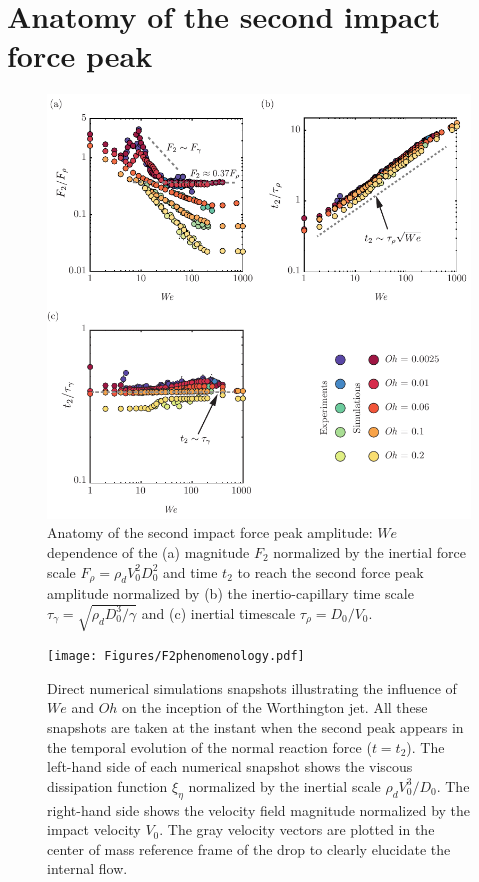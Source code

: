 \documentclass{jfm}
\begin{document}
	\section{Anatomy of the second impact force peak}\label{sec:SecondPeak}
	
	\begin{figure}
		\centering
		\includegraphics[width=\textwidth]{Figures/Force2_Anatomy_v4.pdf}
		\caption{Anatomy of the second impact force peak amplitude: $We$ dependence of the (a) magnitude $F_2$ normalized by the inertial force scale $F_\rho = \rho_dV_0^2D_0^2$ and time $t_2$ to reach the second force peak amplitude normalized by (b) the inertio-capillary time scale $\tau_\gamma = \sqrt{\rho_dD_0^3/\gamma}$ and (c) inertial timescale $\tau_\rho = D_0/V_0$.}
		\label{fig:F2Anatomy}
	\end{figure}
	
	\begin{figure}
		\centering
		\texttt{[image: Figures/F2phenomenology.pdf]}
		\caption{Direct numerical simulations snapshots illustrating the influence of $We$ and $Oh$ on the inception of the Worthington jet. All these snapshots are taken at the instant when the second peak appears in the temporal evolution of the normal reaction force ($t = t_2$). The left-hand side of each numerical snapshot shows the viscous dissipation function $\xi_\eta$ normalized by the inertial scale $\rho_dV_0^3/D_0$. The right-hand side shows the velocity field magnitude normalized by the impact velocity $V_0$. The gray velocity vectors are plotted in the center of mass reference frame of the drop to clearly elucidate the internal flow.}
		\label{fig:F2Phenomenology}
	\end{figure}
	
\end{document}

